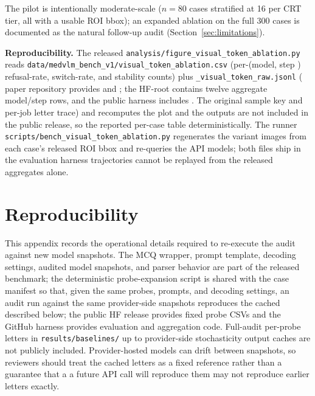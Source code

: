 \documentclass{article}
\providecommand{\DIFaddtex}[1]{{\protect\color{blue} \sf #1}} %
\providecommand{\DIFdeltex}[1]{{\protect\color{red} \scriptsize #1}} %
\providecommand{\DIFaddbegin}{} %
\providecommand{\DIFaddend}{} %
\providecommand{\DIFdelbegin}{} %
\providecommand{\DIFdelend}{} %
\providecommand{\DIFadd}[1]{\texorpdfstring{\DIFaddtex{#1}}{#1}} %
\providecommand{\DIFdel}[1]{\texorpdfstring{\DIFdeltex{#1}}{}} %
\begin{document}
The pilot is intentionally moderate-scale ($n{=}80$ cases stratified at 16 per CRT tier, all with a usable ROI bbox); an expanded ablation on the full 300 cases is documented as the natural follow-up audit (Section~\ref{sec:limitations}).

\textbf{Reproducibility.} The \DIFdelbegin \DIFdel{released \texttt{analysis/figure\_visual\_token\_ablation.py} reads \texttt{data/medvlm\_bench\_v1/visual\_token\_ablation.csv} (per-(model, step ) refusal-rate, switch-rate, and stability counts) plus \texttt{\_visual\_token\_raw.jsonl} (}\DIFdelend \DIFaddbegin \DIFadd{paper repository provides } \DIFadd{and }\DIFadd{; the HF-root } \DIFadd{contains twelve aggregate model/step rows, and the public harness includes }\DIFadd{. The original sample key and }\DIFaddend per-job letter \DIFdelbegin \DIFdel{trace) and recomputes the plot and the }\DIFdelend \DIFaddbegin \DIFadd{outputs are not included in the public release, so the reported }\DIFaddend per-case \DIFdelbegin \DIFdel{table deterministically. The runner \texttt{scripts/bench\_visual\_token\_ablation.py} regenerates the variant images from each case's released ROI bbox and re-queries the API models; both files ship in the evaluation harness}\DIFdelend \DIFaddbegin \DIFadd{trajectories cannot be replayed from the released aggregates alone}\DIFaddend .

\section{Reproducibility}
\label{app:reproducibility}

This appendix records the operational details required to re-execute the audit against new model snapshots. The MCQ wrapper, prompt template, decoding settings, audited model snapshots, and parser behavior are \DIFdelbegin \DIFdel{part of the released benchmark; the deterministic probe-expansion script is shared with the case manifest so that, given the same probes, prompts, and decoding settings, an audit run against the same provider-side snapshots reproduces the cached }\DIFdelend \DIFaddbegin \DIFadd{described below; the public HF release provides fixed probe CSVs and the GitHub harness provides evaluation and aggregation code. Full-audit }\DIFaddend per-probe \DIFdelbegin \DIFdel{letters in \texttt{results/baselines/} up to provider-side stochasticity}\DIFdelend \DIFaddbegin \DIFadd{output caches are not publicly included}\DIFaddend . Provider-hosted models can drift between snapshots, so \DIFdelbegin \DIFdel{reviewers should treat the cached letters as a fixed reference rather than a guarantee that a }\DIFdelend \DIFaddbegin \DIFadd{a }\DIFaddend future API call \DIFdelbegin \DIFdel{will reproduce them }\DIFdelend \DIFaddbegin \DIFadd{may not reproduce earlier letters }\DIFaddend exactly.
\end{document}
